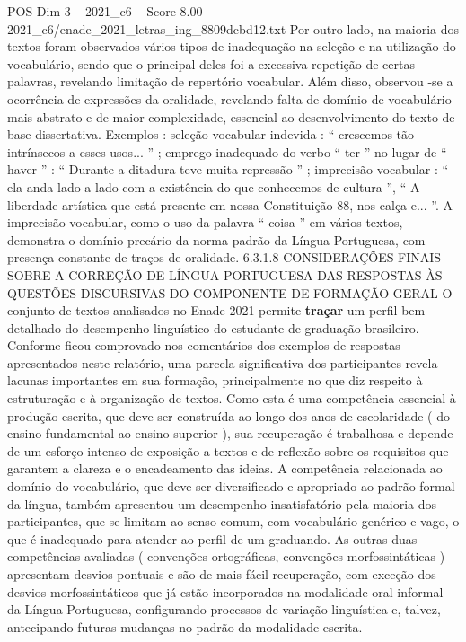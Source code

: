 \begin{textsample}{POS Dim 3 – 2021\_c6 – Score 8.00 – 2021\_c6/enade\_2021\_letras\_ing\_8809dcbd12.txt}
Por outro lado, na maioria dos textos foram observados vários tipos de inadequação na seleção e na utilização do vocabulário, sendo que o principal deles foi a excessiva repetição de certas palavras, revelando limitação de repertório vocabular.
Além disso, observou -se a ocorrência de expressões da oralidade, revelando falta de domínio de vocabulário mais abstrato e de maior complexidade, essencial ao desenvolvimento do texto de base dissertativa.
Exemplos : seleção vocabular indevida : “ crescemos tão intrínsecos a esses usos... ” ; emprego inadequado do verbo “ ter ” no lugar de “ haver ” : “ Durante a ditadura teve muita repressão ” ; imprecisão vocabular : “ ela anda lado a lado com a existência do que conhecemos de cultura ”, “ A liberdade artística que está presente em nossa Constituição 88, nos calça e... ”.
A imprecisão vocabular, como o uso da palavra “ coisa ” em vários textos, demonstra o domínio precário da norma-padrão da Língua Portuguesa, com presença constante de traços de oralidade. 6.3.1.8 CONSIDERAÇÕES FINAIS SOBRE A CORREÇÃO DE LÍNGUA PORTUGUESA DAS RESPOSTAS ÀS QUESTÕES DISCURSIVAS DO COMPONENTE DE FORMAÇÃO GERAL O conjunto de textos analisados no Enade 2021 permite \textbf{traçar} um perfil bem detalhado do desempenho linguístico do estudante de graduação brasileiro.
Conforme ficou comprovado nos comentários dos exemplos de respostas apresentados neste relatório, uma parcela significativa dos participantes revela lacunas importantes em sua formação, principalmente no que diz respeito à estruturação e à organização de textos.
Como esta é uma competência essencial à produção escrita, que deve ser construída ao longo dos anos de escolaridade ( do ensino fundamental ao ensino superior ), sua recuperação é trabalhosa e depende de um esforço intenso de exposição a textos e de reflexão sobre os requisitos que garantem a clareza e o encadeamento das ideias.
A competência relacionada ao domínio do vocabulário, que deve ser diversificado e apropriado ao padrão formal da língua, também apresentou um desempenho insatisfatório pela maioria dos participantes, que se limitam ao senso comum, com vocabulário genérico e vago, o que é inadequado para atender ao perfil de um graduando.
As outras duas competências avaliadas ( convenções ortográficas, convenções morfossintáticas ) apresentam desvios pontuais e são de mais fácil recuperação, com exceção dos desvios morfossintáticos que já estão incorporados na modalidade oral informal da Língua Portuguesa, configurando processos de variação linguística e, talvez, antecipando futuras mudanças no padrão da modalidade escrita.

\end{textsample}
